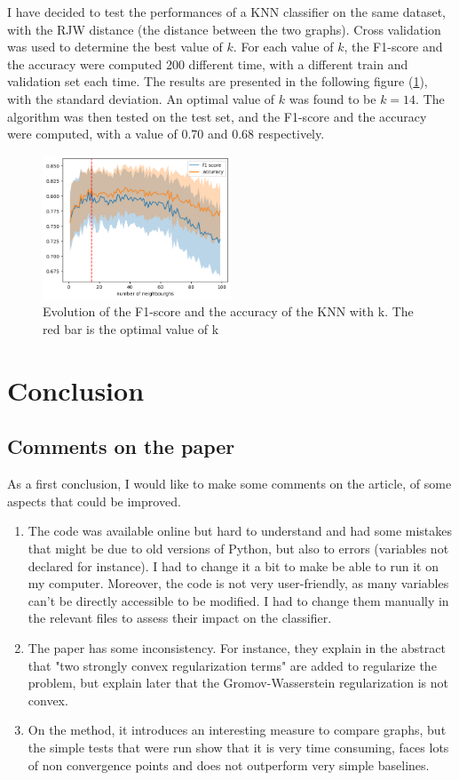 \documentclass[a4paper,11pt]{article}
\begin{document}
I have decided to test the performances of a KNN classifier on the same dataset, with the RJW distance (the distance between the two graphs).
Cross validation was used to determine the best value of $k$.
For each value of $k$, the F1-score and the accuracy were computed 200 different time, with a different train and validation set each time.
The results are presented in the following figure (\ref{fig:knn}), with the standard deviation. 
An optimal value of $k$ was found to be $k=14$. 
The algorithm was then tested on the test set, and the F1-score and the accuracy were computed, with a value of 0.70 and 0.68 respectively.

\begin{figure}[h]
    \centering
    \includegraphics[width=0.5\textwidth]{figures/knn.png}
    \caption{Evolution of the F1-score and the accuracy of the KNN with k. The red bar is the optimal value of k}
    \label{fig:knn}

\end{figure}


\section{Conclusion}

\subsection{Comments on the paper}

As a first conclusion, I would like to make some comments on the article, of some aspects that could be improved. 
\begin{enumerate}
    \item The code was available online but hard to understand and had some mistakes that might be due to old versions of Python, but also to errors (variables not declared for instance). 
    I had to change it a bit to make be able to run it on my computer. Moreover, the code is not very user-friendly, as many variables can't be directly accessible to be modified. I had to change them manually in the relevant files to assess their impact on the classifier. 
    \item The paper has some inconsistency. For instance, they explain in the abstract that "two strongly convex regularization terms" are added to regularize the problem, but explain later that the Gromov-Wasserstein regularization is not convex. 
    \item On the method, it introduces an interesting measure to compare graphs, but the simple tests that were run show that it is very time consuming, faces lots of non convergence points and does not outperform very simple baselines. 
\end{enumerate}
\end{document}
